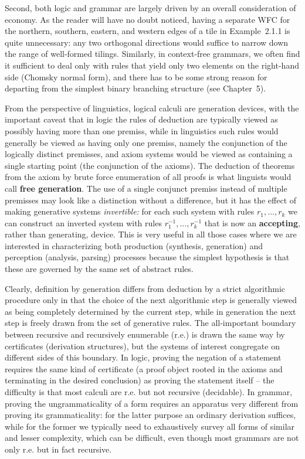 Second, both logic and grammar are largely driven by an overall consideration
of economy. As the reader will have no doubt noticed, having a separate WFC
for the northern, southern, eastern, and western edges of a tile in
Example~2.1.1 is quite unnecessary: any two orthogonal directions would
suffice to narrow down the range of well-formed tilings. Similarly, in
context-free grammars, we often find it sufficient to deal only with rules that
yield only two elements on the right-hand side (Chomsky normal form),
 and there has to be some strong reason for
departing from the simplest binary branching structure (see Chapter~5).

From the perspective of linguistics, logical calculi are generation devices,
with the important caveat that in logic the rules of deduction are typically
viewed as possibly having more than one premiss, while in linguistics such
rules would generally be viewed as having only one premiss, namely the
conjunction of the logically distinct premisses, and axiom systems would be
viewed as containing a single starting point (the conjunction of the axioms).
The deduction of theorems from the axiom by brute force enumeration of all
proofs is what linguists would call {\bf free generation}.
The use of a single conjunct premiss instead of
multiple premisses may look like a distinction without a difference, but it
has the effect of making generative systems {\it invertible:} for each such
system with rules $r_1,\ldots,r_k$ we can construct an inverted system with
rules $r_1^{-1},\ldots,r_k^{-1}$ that is now an {\bf accepting}, rather than
generating, device. This is very useful in all those
cases where we are interested in characterizing both production (synthesis,
generation) and perception (analysis, parsing) processes because the simplest
hypothesis is that these are governed by the same set of abstract rules. 

Clearly, definition by generation differs from deduction by a strict
algorithmic procedure only in that the choice of the next algorithmic step is
generally viewed as being completely determined by the current step, while in
generation the next step is freely drawn from the set of generative rules.
The all-important boundary between recursive and recursively enumerable (r.e.)
is drawn the same way by certificates (derivation structures), but the systems
of interest congregate on different sides of this boundary. In logic, proving
the negation of a statement requires the same kind of certificate (a proof
object rooted in the axioms and terminating in the desired conclusion) as
proving the statement itself -- the difficulty is that most calculi are r.e.
but not recursive (decidable). In grammar, proving the ungrammaticality of a
form requires an apparatus very different from proving its grammaticality: for
the latter purpose an ordinary derivation suffices, while for the former we
typically need to exhaustively survey all forms of similar and lesser
complexity, which can be difficult, even though most grammars are not only
r.e. but in fact recursive.   


